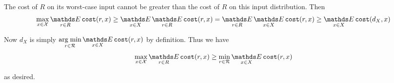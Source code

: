 The cost of $R$ on its worst-case input cannot be greater than the cost of $R$ on this input distribution. Then
\[\max_{x\in\mathcal{X}}\Expected_{r\in R}\texttt{cost}(r,x)
\ge \Expected_{x\in X}\Expected_{r\in R}\texttt{cost}(r,x)
= \Expected_{r\in R}\Expected_{x\in X}\texttt{cost}(r,x)
\ge \Expected_{x\in X}\texttt{cost}(d_X,x)\]

Now $d_X$ is simply $\argmin_{r\in\mathcal{R}}\Expected_{x\in X}\texttt{cost}(r,x)$ by definition. Thus we have
\[\max_{x\in\mathcal{X}}\Expected_{r\in R}\texttt{cost}(r,x) \ge \min_{r\in\mathcal{R}}\Expected_{x\in X}\texttt{cost}(r,x)\]

as desired.










